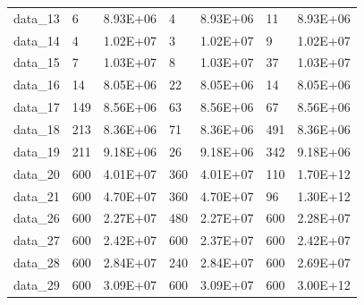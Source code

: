 \begin{table}[!h]
\begin{tabular}{lllllll}
data\_13 & 6                  & 8.93E+06               & 4                   & 8.93E+06                & 11                   & 8.93E+06                \\
data\_14 & 4                  & 1.02E+07               & 3                   & 1.02E+07                & 9                    & 1.02E+07                \\
data\_15 & 7                  & 1.03E+07               & 8                   & 1.03E+07                & 37                   & 1.03E+07                \\
data\_16 & 14                 & 8.05E+06               & 22                  & 8.05E+06                & 14                   & 8.05E+06                \\
data\_17 & 149                & 8.56E+06               & 63                  & 8.56E+06                & 67                   & 8.56E+06                \\
data\_18 & 213                & 8.36E+06               & 71                  & 8.36E+06                & 491                  & 8.36E+06                \\
data\_19 & 211                & 9.18E+06               & 26                  & 9.18E+06                & 342                  & 9.18E+06                \\
data\_20 & 600                & 4.01E+07               & 360                 & 4.01E+07                & 110                  & 1.70E+12                \\
data\_21 & 600                & 4.70E+07               & 360                 & 4.70E+07                & 96                   & 1.30E+12                \\
data\_26 & 600                & 2.27E+07               & 480                 & 2.27E+07                & 600                  & 2.28E+07                \\
data\_27 & 600                & 2.42E+07               & 600                 & 2.37E+07                & 600                  & 2.42E+07                \\
data\_28 & 600                & 2.84E+07               & 240                 & 2.84E+07                & 600                  & 2.69E+07                \\
data\_29 & 600                & 3.09E+07               & 600                 & 3.09E+07                & 600                  & 3.00E+12                \\ \hline
\end{tabular}
\end{table}



